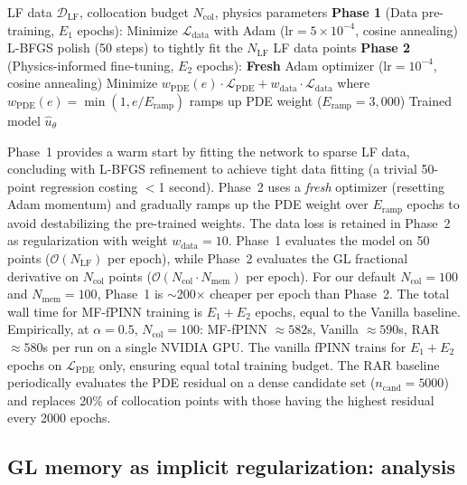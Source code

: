 \documentclass[11pt]{article}
\newcommand{\Lcal}{\mathcal{L}}
\newcommand{\Ncol}{N_{\mathrm{col}}}
\newcommand{\NLF}{N_{\mathrm{LF}}}
\begin{document}
\begin{algorithm}[h]
\caption{MF-fPINN Two-Phase Training}
\label{alg:mf}
\begin{algorithmic}[1]
\REQUIRE LF data $\mathcal{D}_{\mathrm{LF}}$, collocation budget $\Ncol$, physics parameters
\STATE \textbf{Phase 1} (Data pre-training, $E_1$ epochs):
\STATE \quad Minimize $\Lcal_{\mathrm{data}}$ with Adam ($\mathrm{lr} = 5 \times 10^{-4}$, cosine annealing)
\STATE \quad L-BFGS polish (50 steps) to tightly fit the $\NLF$ LF data points
\STATE \textbf{Phase 2} (Physics-informed fine-tuning, $E_2$ epochs):
\STATE \quad \textbf{Fresh} Adam optimizer ($\mathrm{lr} = 10^{-4}$, cosine annealing)
\STATE \quad Minimize $w_{\mathrm{PDE}}(e) \cdot \Lcal_{\mathrm{PDE}} + w_{\mathrm{data}} \cdot \Lcal_{\mathrm{data}}$
\STATE \quad where $w_{\mathrm{PDE}}(e) = \min(1, e/E_{\mathrm{ramp}})$ ramps up PDE weight ($E_{\mathrm{ramp}} = 3{,}000$)
\RETURN Trained model $\hat{u}_\theta$
\end{algorithmic}
\end{algorithm}

Phase~1 provides a warm start by fitting the network to sparse LF data, concluding with L-BFGS refinement to achieve tight data fitting (a trivial 50-point regression costing $<$1 second). Phase~2 uses a \emph{fresh} optimizer (resetting Adam momentum) and gradually ramps up the PDE weight over $E_{\mathrm{ramp}}$ epochs to avoid destabilizing the pre-trained weights. The data loss is retained in Phase~2 as regularization with weight $w_{\mathrm{data}} = 10$. Phase~1 evaluates the model on 50 points ($\mathcal{O}(\NLF)$ per epoch), while Phase~2 evaluates the GL fractional derivative on $\Ncol$ points ($\mathcal{O}(\Ncol \cdot N_{\mathrm{mem}})$ per epoch). For our default $\Ncol = 100$ and $N_{\mathrm{mem}} = 100$, Phase~1 is $\sim$200$\times$ cheaper per epoch than Phase~2. The total wall time for MF-fPINN training is $E_1 + E_2$ epochs, equal to the Vanilla baseline. Empirically, at $\alpha = 0.5$, $\Ncol = 100$: MF-fPINN $\approx 582$s, Vanilla $\approx 590$s, RAR $\approx 580$s per run on a single NVIDIA GPU. The vanilla fPINN trains for $E_1 + E_2$ epochs on $\Lcal_{\mathrm{PDE}}$ only, ensuring equal total training budget. The RAR baseline \cite{wu2023comprehensive} periodically evaluates the PDE residual on a dense candidate set ($n_{\mathrm{cand}} = 5000$) and replaces 20\% of collocation points with those having the highest residual every 2000 epochs.

\subsection{GL memory as implicit regularization: analysis}
\label{sec:gl_theory}
\end{document}
